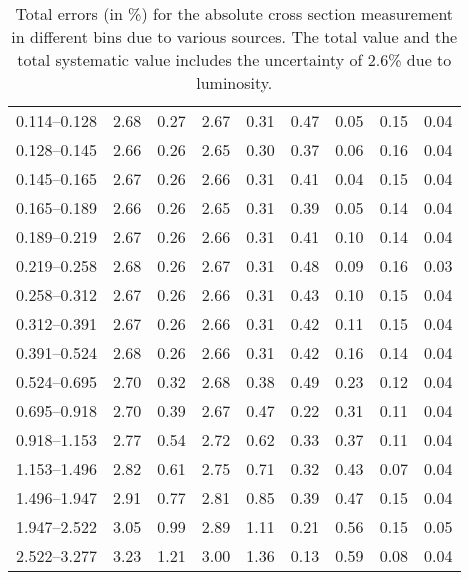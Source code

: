\begin{table}
\begin{center}
\begin{tabular}{@{}l l l l l l l l l@{}}
            0.114--0.128 & 2.68 & 0.27 & 2.67 & 0.31 & 0.47 & 0.05 & 0.15 & 0.04  \\
            0.128--0.145 & 2.66 & 0.26 & 2.65 & 0.30 & 0.37 & 0.06 & 0.16 & 0.04  \\
            0.145--0.165 & 2.67 & 0.26 & 2.66 & 0.31 & 0.41 & 0.04 & 0.15 & 0.04  \\
            0.165--0.189 & 2.66 & 0.26 & 2.65 & 0.31 & 0.39 & 0.05 & 0.14 & 0.04  \\
            0.189--0.219 & 2.67 & 0.26 & 2.66 & 0.31 & 0.41 & 0.10 & 0.14 & 0.04  \\
            0.219--0.258 & 2.68 & 0.26 & 2.67 & 0.31 & 0.48 & 0.09 & 0.16 & 0.03  \\
            0.258--0.312 & 2.67 & 0.26 & 2.66 & 0.31 & 0.43 & 0.10 & 0.15 & 0.04  \\
            0.312--0.391 & 2.67 & 0.26 & 2.66 & 0.31 & 0.42 & 0.11 & 0.15 & 0.04  \\
            0.391--0.524 & 2.68 & 0.26 & 2.66 & 0.31 & 0.42 & 0.16 & 0.14 & 0.04  \\
            0.524--0.695 & 2.70 & 0.32 & 2.68 & 0.38 & 0.49 & 0.23 & 0.12 & 0.04  \\
            0.695--0.918 & 2.70 & 0.39 & 2.67 & 0.47 & 0.22 & 0.31 & 0.11 & 0.04  \\
            0.918--1.153 & 2.77 & 0.54 & 2.72 & 0.62 & 0.33 & 0.37 & 0.11 & 0.04  \\
            1.153--1.496 & 2.82 & 0.61 & 2.75 & 0.71 & 0.32 & 0.43 & 0.07 & 0.04  \\
            1.496--1.947 & 2.91 & 0.77 & 2.81 & 0.85 & 0.39 & 0.47 & 0.15 & 0.04  \\
            1.947--2.522 & 3.05 & 0.99 & 2.89 & 1.11 & 0.21 & 0.56 & 0.15 & 0.05  \\
            2.522--3.277 & 3.23 & 1.21 & 3.00 & 1.36 & 0.13 & 0.59 & 0.08 & 0.04  \\
            \bottomrule
        \end{tabular}
    \end{center}
    \caption[
        Total errors (in \%) for the absolute cross section measurement.
    ]{
        Total errors (in \%) for the absolute cross section measurement in
        different \phistar bins due to various sources. The total value and the
        total systematic value includes the uncertainty of 2.6\% due to
        luminosity.
    }
    \label{tab:sys_uncert_abs}
\end{table}
